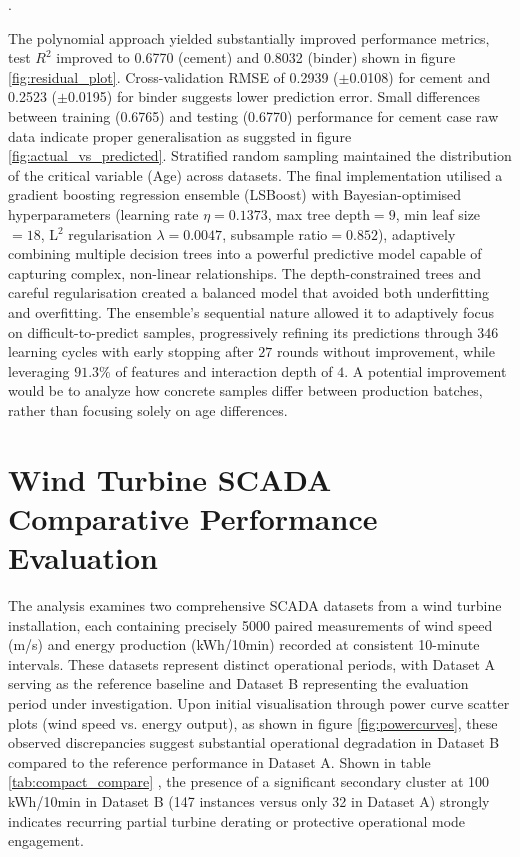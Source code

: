 .\documentclass[a4paper,11pt]{article}
\begin{document}
\vspace{-5pt} The polynomial approach yielded substantially improved performance metrics, test $R^2$ improved to 0.6770 (cement) and 0.8032 (binder) shown in figure \ref{fig:residual_plot}. Cross-validation RMSE of 0.2939 ($\pm$0.0108) for cement and 0.2523 ($\pm$0.0195) for binder suggests lower prediction error. Small differences between training (0.6765) and testing (0.6770) performance for cement case raw data indicate proper generalisation as suggsted in figure \ref{fig:actual_vs_predicted}. Stratified random sampling maintained the distribution of the critical variable (Age) across datasets. The final implementation utilised a gradient boosting regression ensemble (LSBoost) with Bayesian-optimised hyperparameters (learning rate $\eta=0.1373$, max tree depth$=9$, min leaf size$=18$, L$^2$ regularisation $\lambda=0.0047$, subsample ratio$=0.852$), adaptively combining multiple decision trees into a powerful predictive model capable of capturing complex, non-linear relationships. The depth-constrained trees and careful regularisation created a balanced model that avoided both underfitting and overfitting. The ensemble's sequential nature allowed it to adaptively focus on difficult-to-predict samples, progressively refining its predictions through $346$ learning cycles with early stopping after $27$ rounds without improvement, while leveraging $91.3\%$ of features and interaction depth of $4$. A potential improvement would be to analyze how concrete samples differ between production batches, rather than focusing solely on age differences. 

   
\newpage


   
 















\newpage
 
\section*{Wind Turbine SCADA Comparative Performance Evaluation}

 
The analysis examines two comprehensive SCADA datasets from a wind turbine installation, each containing precisely 5000 paired measurements of wind speed (m/s) and energy production (kWh/10min) recorded at consistent 10-minute intervals. These datasets represent distinct operational periods, with Dataset A serving as the reference baseline and Dataset B representing the evaluation period under investigation. Upon initial visualisation through power curve scatter plots (wind speed vs. energy output), as shown in figure \ref{fig:powercurves}, these observed discrepancies suggest substantial operational degradation in Dataset B compared to the reference performance in Dataset A.  Shown in table \ref{tab:compact_compare} , the presence of a significant secondary cluster at 100 kWh/10min in Dataset B (147 instances versus only 32 in Dataset A) strongly indicates recurring partial turbine derating or protective operational mode engagement.
\end{document}
